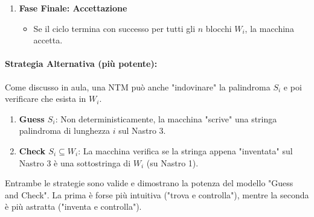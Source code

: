 \documentclass[a4paper]{article}
\theoremstyle{definition} %
\begin{document}
\begin{enumerate}
    \item \textbf{Fase Finale: Accettazione}
        \begin{itemize}
            \item Se il ciclo termina con successo per tutti gli $n$ blocchi $W_i$, la macchina accetta.
        \end{itemize}
\end{enumerate}

\paragraph{Strategia Alternativa (più potente):} Come discusso in aula, una NTM può anche "indovinare" la palindroma $S_i$ e poi verificare che esista in $W_i$.
\begin{enumerate}
    \item \textbf{Guess $S_i$}: Non deterministicamente, la macchina "scrive" una stringa palindroma di lunghezza $i$ sul Nastro 3.
    \item \textbf{Check $S_i \subseteq W_i$}: La macchina verifica se la stringa appena "inventata" sul Nastro 3 è una sottostringa di $W_i$ (su Nastro 1).
\end{enumerate}
Entrambe le strategie sono valide e dimostrano la potenza del modello "Guess and Check". La prima è forse più intuitiva ("trova e controlla"), mentre la seconda è più astratta ("inventa e controlla").
\end{document}
